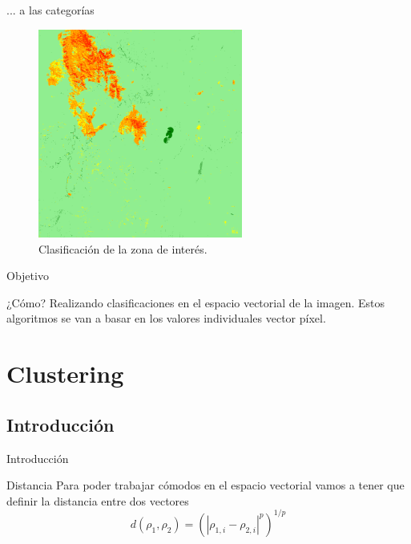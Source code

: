 \documentclass[handout]{beamer}
\begin{document}
\begin{frame}{... a las categorías}
  \begin{figure}
  \includegraphics[width=0.6\textwidth]{imagenes/im_class.png}
  \caption{Clasificación de la zona de interés.}
\end{figure}
\end{frame}

\begin{frame}{Objetivo}
  \begin{exampleblock}{¿Cómo?}
    Realizando clasificaciones en el espacio vectorial de la imagen. Estos algoritmos se van a basar en los valores individuales vector píxel.
  \end{exampleblock}
\end{frame}

\section{Clustering}

\subsection{Introducción}

\begin{frame}{Introducción}
  \begin{block}{Distancia}
    Para poder trabajar cómodos en el espacio vectorial vamos a tener que definir la distancia entre dos vectores
    \begin{equation}
    d(\rho_1, \rho_2) = \left( | \rho_{1,i} - \rho_{2,i} |^p \right)^{1/p}
    \end{equation}
  \end{block}
\end{frame}
\end{document}

